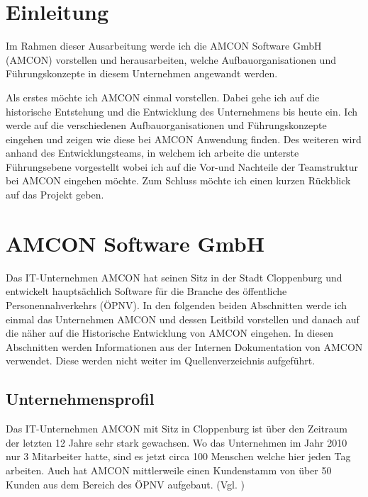 \newcommand{\as}{\glqq}
\newcommand{\ad}{\grqq}
\newcommand{\adl}{\grqq{ }}

\newcommand{\fref}[1]{Abb. \ref{#1}} %

\section{Einleitung}
    Im Rahmen dieser Ausarbeitung werde ich die AMCON Software GmbH (AMCON) vorstellen und herausarbeiten, welche 
    Aufbauorganisationen und Führungskonzepte in diesem Unternehmen angewandt werden.

    Als erstes möchte ich AMCON einmal vorstellen. Dabei gehe ich auf die historische Entstehung und die Entwicklung des 
    Unternehmens bis heute ein. Ich werde auf die verschiedenen Aufbauorganisationen und Führungskonzepte eingehen und 
    zeigen wie diese bei AMCON Anwendung finden. Des weiteren wird anhand des Entwicklungsteams, in welchem ich arbeite 
    die unterste Führungsebene vorgestellt wobei ich auf die Vor-und Nachteile der Teamstruktur bei AMCON eingehen 
    möchte. Zum Schluss möchte ich einen kurzen Rückblick auf das Projekt geben.


\section{AMCON Software GmbH}
    Das IT-Unternehmen AMCON hat seinen Sitz in der Stadt Cloppenburg und entwickelt hauptsächlich Software für die 
    Branche des öffentliche Personennahverkehrs (ÖPNV). In den folgenden beiden Abschnitten werde ich einmal das 
    Unternehmen AMCON und dessen Leitbild vorstellen und danach auf die näher auf die Historische Entwicklung von AMCON 
    eingehen. In diesen Abschnitten werden Informationen aus der Internen Dokumentation von AMCON verwendet. Diese 
    werden nicht weiter im Quellenverzeichnis aufgeführt.

    \subsection{Unternehmensprofil}
        Das IT-Unternehmen AMCON mit Sitz in Cloppenburg ist über den Zeitraum der letzten 12 Jahre sehr stark 
        gewachsen. Wo das Unternehmen im Jahr 2010 nur 3 Mitarbeiter hatte, sind es jetzt circa 100 Menschen welche hier
        jeden Tag arbeiten. Auch hat AMCON mittlerweile einen Kundenstamm von über 50 Kunden aus dem Bereich des ÖPNV
        aufgebaut. (Vgl. \cite{AMC22c})

